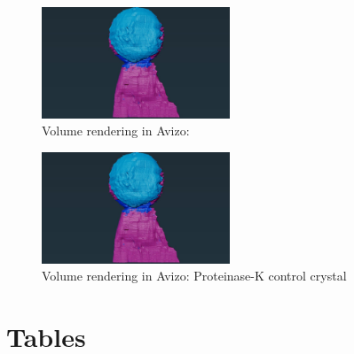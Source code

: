\begin{figure}
	\includegraphics[width=0.5\textwidth]{images/avizo_flats/prot_ls.jpg}
	\caption{Volume rendering in Avizo:}
\end{figure}
\begin{figure}
	\includegraphics[width=0.5\textwidth]{images/avizo_flats/prot_ls.jpg}
	\caption{Volume rendering in Avizo: Proteinase-K control crystal}
\end{figure}


\onecolumn


\newpage
\section{Tables}

